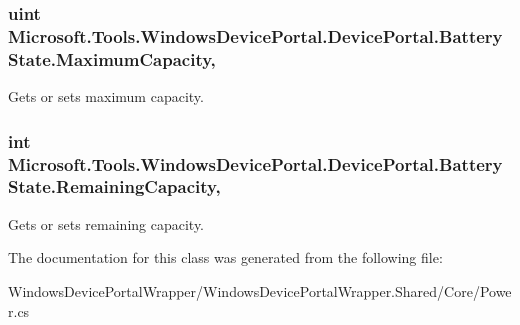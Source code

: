 \subsubsection[{\texorpdfstring{Maximum\+Capacity}{MaximumCapacity}}]{\setlength{\rightskip}{0pt plus 5cm}uint Microsoft.\+Tools.\+Windows\+Device\+Portal.\+Device\+Portal.\+Battery\+State.\+Maximum\+Capacity\hspace{0.3cm}{\ttfamily [get]}, {\ttfamily [set]}}\hypertarget{class_microsoft_1_1_tools_1_1_windows_device_portal_1_1_device_portal_1_1_battery_state_a270a4beca6e1d5046707581bbbdb6777}{}\label{class_microsoft_1_1_tools_1_1_windows_device_portal_1_1_device_portal_1_1_battery_state_a270a4beca6e1d5046707581bbbdb6777}


Gets or sets maximum capacity. 

\subsubsection[{\texorpdfstring{Remaining\+Capacity}{RemainingCapacity}}]{\setlength{\rightskip}{0pt plus 5cm}int Microsoft.\+Tools.\+Windows\+Device\+Portal.\+Device\+Portal.\+Battery\+State.\+Remaining\+Capacity\hspace{0.3cm}{\ttfamily [get]}, {\ttfamily [set]}}\hypertarget{class_microsoft_1_1_tools_1_1_windows_device_portal_1_1_device_portal_1_1_battery_state_adad259b4fae1543afc538b98e8302ab8}{}\label{class_microsoft_1_1_tools_1_1_windows_device_portal_1_1_device_portal_1_1_battery_state_adad259b4fae1543afc538b98e8302ab8}


Gets or sets remaining capacity. 



The documentation for this class was generated from the following file\+:\begin{DoxyCompactItemize}
\item 
Windows\+Device\+Portal\+Wrapper/\+Windows\+Device\+Portal\+Wrapper.\+Shared/\+Core/Power.\+cs\end{DoxyCompactItemize}

